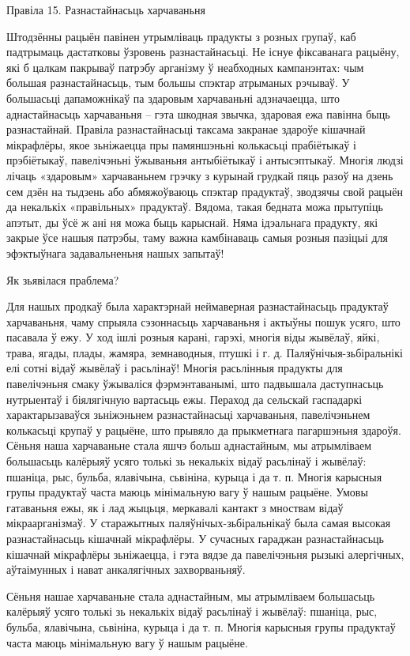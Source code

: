 Правіла 15. Разнастайнасьць харчаваньня

Штодзённы рацыён павінен утрымліваць прадукты з розных групаў, каб падтрымаць дастатковы ўзровень разнастайнасьці. Не існуе фіксаванага рацыёну, які б цалкам пакрываў патрэбу арганізму ў неабходных кампанэнтах: чым большая разнастайнасьць, тым большы спэктар атрыманых рэчываў. У большасьці дапаможнікаў па здаровым харчаваньні адзначаецца, што аднастайнасьць харчаваньня – гэта шкодная звычка, здаровая ежа павінна быць разнастайнай. Правіла разнастайнасьці таксама закранае здароўе кішачнай мікрафлёры, якое зьніжаецца пры памяншэньні колькасьці прабіётыкаў і прэбіётыкаў, павелічэньні ўжываньня антыбіётыкаў і антысэптыкаў.
Многія людзі лічаць «здаровым» харчаваньнем грэчку з курынай грудкай пяць разоў на дзень сем дзён на тыдзень або абмяжоўваюць спэктар прадуктаў, зводзячы свой рацыён да некалькіх «правільных» прадуктаў. Вядома, такая бедната можа прытупіць апэтыт, ды ўсё ж ані ня можа быць карыснай. Няма ідэальнага прадукту, які закрые ўсе нашыя патрэбы, таму важна камбінаваць самыя розныя пазіцыі для эфэктыўнага задавальненьня нашых запытаў!

Як зьявілася праблема?

Для нашых продкаў была характэрнай неймаверная разнастайнасьць прадуктаў харчаваньня, чаму спрыяла сэзоннасьць харчаваньня і актыўны пошук усяго, што пасавала ў ежу. У ход ішлі розныя карані, гарэхі, многія віды жывёлаў, яйкі, трава, ягады, плады, жамяра, земнаводныя, птушкі і г. д. Паляўнічыя-зьбіральнікі елі сотні відаў жывёлаў і расьлінаў! Многія расьлінныя прадукты для павелічэньня смаку ўжываліся фэрмэнтаванымі, што падвышала даступнасьць нутрыентаў і біялягічную вартасьць ежы. Пераход да сельскай гаспадаркі характарызаваўся зьніжэньнем разнастайнасьці харчаваньня, павелічэньнем колькасьці крупаў у рацыёне, што прывяло да прыкметнага пагаршэньня здароўя. Сёньня наша харчаваньне стала яшчэ больш аднастайным, мы атрымліваем большасьць калёрыяў усяго толькі зь некалькіх відаў расьлінаў і жывёлаў: пшаніца, рыс, бульба, ялавічына, сьвініна, курыца і да т. п. Многія карысныя групы прадуктаў часта маюць мінімальную вагу ў нашым рацыёне.
Умовы гатаваньня ежы, як і лад жыцьця, меркавалі кантакт з мноствам відаў мікраарганізмаў. У старажытных паляўнічых-зьбіральнікаў была самая высокая разнастайнасьць кішачнай мікрафлёры. У сучасных гараджан разнастайнасьць кішачнай мікрафлёры зьніжаецца, і гэта вядзе да павелічэньня рызыкі алергічных, аўтаімунных і нават анкалягічных захворваньняў.

Сёньня нашае харчаваньне стала аднастайным, мы атрымліваем большасьць калёрыяў усяго толькі зь некалькіх відаў расьлінаў і жывёлаў: пшаніца, рыс, бульба, ялавічына, сьвініна, курыца і да т. п. Многія карысныя групы прадуктаў часта маюць мінімальную вагу ў нашым рацыёне.

